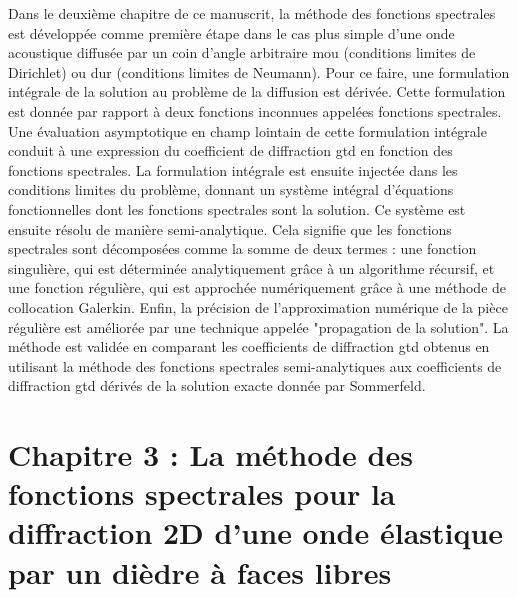 Dans le deuxième chapitre de ce manuscrit, la méthode des fonctions spectrales est développée comme première étape dans le cas plus simple d'une onde acoustique diffusée par un coin d'angle arbitraire mou (conditions limites de Dirichlet) ou dur (conditions limites de Neumann). Pour ce faire, une formulation intégrale de la solution au problème de la diffusion est dérivée. Cette formulation est donnée par rapport à deux fonctions inconnues appelées fonctions spectrales. Une évaluation asymptotique en champ lointain de cette formulation intégrale conduit à une expression du coefficient de diffraction \acrshort{gtd} en fonction des fonctions spectrales. La formulation intégrale est ensuite injectée dans les conditions limites du problème, donnant un système intégral d'équations fonctionnelles dont les fonctions spectrales sont la solution. Ce système est ensuite résolu de manière semi-analytique. Cela signifie que les fonctions spectrales sont décomposées comme la somme de deux termes : une fonction singulière, qui est déterminée analytiquement grâce à un algorithme récursif, et une fonction régulière, qui est approchée numériquement grâce à une méthode de collocation Galerkin. Enfin, la précision de l'approximation numérique de la pièce régulière est améliorée par une technique appelée "propagation de la solution". La méthode est validée en comparant les coefficients de diffraction \acrshort{gtd} obtenus en utilisant la méthode des fonctions spectrales semi-analytiques aux coefficients de diffraction \acrshort{gtd} dérivés de la solution exacte donnée par Sommerfeld.

\section[Résumé de la thèse en français]{Chapitre 3 : La méthode des fonctions spectrales pour la diffraction 2D d'une onde élastique par un dièdre à faces libres}

